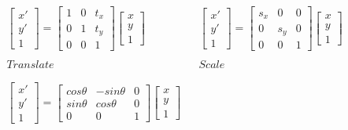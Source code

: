 \documentclass{article}
\begin{document}
\begin{equation*}
    \begin{matrix}
        \begin{bmatrix}
            x' \\ y' \\ 1
        \end{bmatrix} = 
        \begin{bmatrix}
            1 & 0 & t_x \\
            0 & 1 & t_y \\
            0 & 0 & 1
        \end{bmatrix}
        \begin{bmatrix}
            x \\ y \\ 1
        \end{bmatrix} & & 
        \begin{bmatrix}
            x' \\ y' \\ 1
        \end{bmatrix} = 
        \begin{bmatrix}
            s_x & 0 & 0 \\
            0 & s_y & 0 \\
            0 & 0 & 1
        \end{bmatrix}
        \begin{bmatrix}
            x \\ y \\ 1
        \end{bmatrix} \\
        \\
        Translate & & Scale \\
        \\
        \\
        \begin{bmatrix}
            x' \\ y' \\ 1
        \end{bmatrix} = 
        \begin{bmatrix}
            cos\theta & -sin\theta & 0 \\
            sin\theta & cos\theta & 0 \\
            0 & 0 & 1
        \end{bmatrix}
        \begin{bmatrix}
            x \\ y \\ 1
        \end{bmatrix} & & 

\end{matrix}
\end{equation*}
\end{document}
